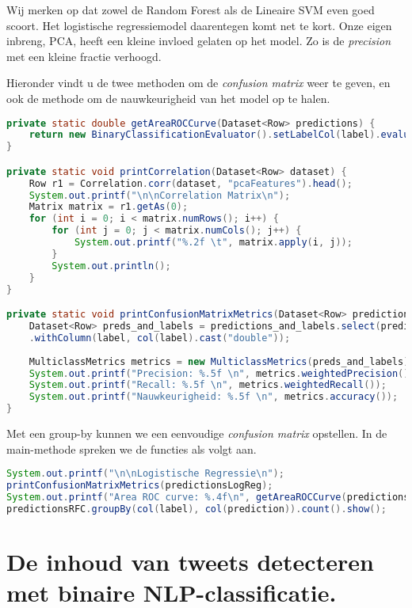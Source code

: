 \documentclass[a4paper,10pt,twoside]{report}
\begin{document}
Wij merken op dat zowel de Random Forest als de Lineaire SVM even goed scoort. Het logistische regressiemodel daarentegen komt net te kort. Onze eigen inbreng, PCA, heeft een kleine invloed gelaten op het model. Zo is de \textit{precision} met een kleine fractie verhoogd. 

Hieronder vindt u de twee methoden om de \textit{confusion matrix} weer te geven, en ook de methode om de nauwkeurigheid van het model op te halen.

\begin{lstlisting}[language=Java]
private static double getAreaROCCurve(Dataset<Row> predictions) {
	return new BinaryClassificationEvaluator().setLabelCol(label).evaluate(predictions);
}

private static void printCorrelation(Dataset<Row> dataset) {
	Row r1 = Correlation.corr(dataset, "pcaFeatures").head();
	System.out.printf("\n\nCorrelation Matrix\n");
	Matrix matrix = r1.getAs(0);
	for (int i = 0; i < matrix.numRows(); i++) {
		for (int j = 0; j < matrix.numCols(); j++) {
			System.out.printf("%.2f \t", matrix.apply(i, j));
		}
		System.out.println();
	}
}

private static void printConfusionMatrixMetrics(Dataset<Row> predictions_and_labels) {
	Dataset<Row> preds_and_labels = predictions_and_labels.select(prediction, label).orderBy(prediction)
	.withColumn(label, col(label).cast("double"));
	
	MulticlassMetrics metrics = new MulticlassMetrics(preds_and_labels);
	System.out.printf("Precision: %.5f \n", metrics.weightedPrecision());
	System.out.printf("Recall: %.5f \n", metrics.weightedRecall());
	System.out.printf("Nauwkeurigheid: %.5f \n", metrics.accuracy());
}

\end{lstlisting}

Met een group-by kunnen we een eenvoudige \textit{confusion matrix} opstellen. In de main-methode spreken we de functies als volgt aan.

\begin{lstlisting}[language=Java]
System.out.printf("\n\nLogistische Regressie\n");
printConfusionMatrixMetrics(predictionsLogReg);
System.out.printf("Area ROC curve: %.4f\n", getAreaROCCurve(predictionsLogReg));
predictionsRFC.groupBy(col(label), col(prediction)).count().show(); 
\end{lstlisting}

\chapter{De inhoud van tweets detecteren met binaire NLP-classificatie.}
\end{document}
